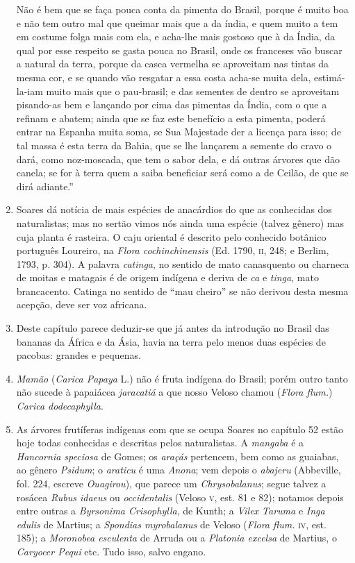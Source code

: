 \begin{enumerate}
Não é bem que se faça pouca conta da pimenta do Brasil, porque é muito boa e não 
tem outro mal que queimar mais que a da índia, e quem muito a tem em costume folga mais 
com ela, e acha-lhe mais gostoso que à da Índia, da qual por esse respeito se gasta pouca no 
Brasil, onde os franceses vão buscar a natural da terra, porque da casca vermelha se 
aproveitam nas tintas da mesma cor, e se quando vão resgatar a essa costa acha-se muita dela, 
estimá-la-iam muito mais que o pau-brasil; e das sementes de dentro se aproveitam 
pisando-as bem e lançando por cima das pimentas da Índia, com o que a refinam e abatem; 
ainda que se faz este benefício a esta pimenta, poderá entrar na Espanha muita soma, se Sua 
Majestade der a licença para isso; de tal massa é esta terra da Bahia, que se lhe lançarem a 
semente do cravo o dará, como noz-moscada, que tem o sabor dela, e dá outras árvores que 
dão canela; se for à terra quem a saiba beneficiar será como a de Ceilão, de que se dirá 
adiante.''

\item  Soares dá notícia de mais espécies de anacárdios do que as conhecidas dos 
naturalistas; mas no sertão vimos nós ainda uma espécie (talvez gênero) mas cuja planta é 
rasteira. O caju oriental é descrito pelo conhecido botânico português Loureiro, na 
\textit{Flora cochinchinensis} (Ed. 1790, \textsc{ii}, 248; e Berlim, 1793, p. 304).
A palavra \textit{catinga}, no sentido de mato canasquento ou charneca de moitas e matagais é 
de origem indígena e deriva de \textit{ca} e \textit{tinga}, mato brancacento. Catinga no sentido de ``mau 
cheiro'' se não derivou desta mesma acepção, deve ser voz africana.

\item Deste capítulo 
parece deduzir-se que já antes da introdução no Brasil das bananas 
da África e da Ásia, havia na terra pelo menos duas espécies de pacobas: grandes e 
pequenas.

\item \textit{Mamão} (\textit{Carica Papaya} L.) não é fruta indígena do Brasil; porém outro tanto não 
sucede à papaiácea \textit{jaracatiá} a que nosso Veloso chamou (\textit{Flora flum.}) \textit{Carica dodecaphylla}.

\item As árvores frutíferas indígenas com que se ocupa Soares no capítulo 52 estão hoje 
todas conhecidas e descritas pelos naturalistas. A \textit{mangaba} é a \textit{Hancornia speciosa} de 
Gomes; os \textit{araçás} pertencem, bem como as guaiabas, ao gênero \textit{Psidum}; o \textit{araticu} é uma  
\textit{Anona}; vem depois o \textit{abajeru} (Abbeville, fol. 224, escreve \textit{Ouagirou}), que parece um \textit{Chrysobalanus}; 
segue talvez a rosácea \textit{Rubus idaeus} ou \textit{occidentalis} (Veloso \textsc{v}, est. 81 
e 82); notamos depois entre outras a \textit{Byrsonima Crisophylla}, de Kunth; a \textit{Vilex Taruma} e  
\textit{Inga edulis} de Martius; a \textit{Spondias myrobalanus} de Veloso (\textit{Flora flum.} \textsc{iv}, est. 185); a  
\textit{Moronobea esculenta} de Arruda ou a \textit{Platonia excelsa} de Martius, o \textit{Caryocer Pequi} 
etc. Tudo isso, salvo engano.


\end{enumerate}
